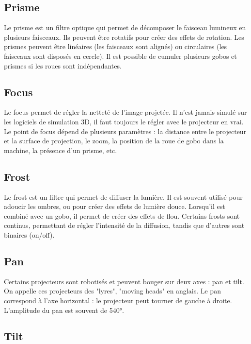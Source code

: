 \subsection{Prisme}
\label{subsec:param_prisme}

Le prisme est un filtre optique qui permet de décomposer le faisceau lumineux en plusieurs faisceaux. Ils peuvent être rotatifs pour créer des effets de rotation.
Les prismes peuvent être linéaires (les faisceaux sont alignés) ou circulaires (les faisceaux sont disposés en cercle).
\newline
Il est possible de cumuler plusieurs gobos et prismes si les roues sont indépendantes.

\subsection{Focus}
\label{subsec:param_focus}

Le focus permet de régler la netteté de l'image projetée. Il n'est jamais simulé sur les logiciels de simulation 3D, il faut toujours le régler avec le projecteur en vrai.
Le point de focus dépend de plusieurs paramètres : la distance entre le projecteur et la surface de projection, le zoom, la position de la roue de gobo dans la machine, la présence d'un prisme, etc.

\subsection{Frost}
\label{subsec:param_frost}

Le frost est un filtre qui permet de diffuser la lumière. Il est souvent utilisé pour adoucir les ombres, ou pour créer des effets de lumière douce. Lorsqu'il est combiné avec un gobo, il permet de créer des effets de flou.
Certains frosts sont continus, permettant de régler l'intensité de la diffusion, tandis que d'autres sont binaires (on/off).

\subsection{Pan}
\label{subsec:param_pan}

Certains projecteurs sont robotisés et peuvent bouger sur deux axes : pan et tilt. On appelle ces projecteurs des "lyres", "moving heads" en anglais.
Le pan correspond à l'axe horizontal : le projecteur peut tourner de gauche à droite.
L'amplitude du pan est souvent de 540°.

\subsection{Tilt}
\label{subsec:param_tilt}

